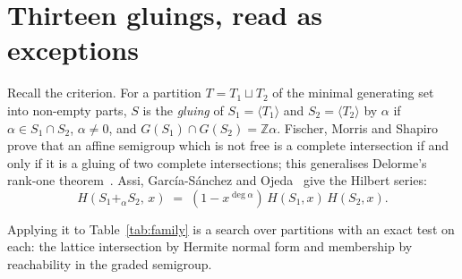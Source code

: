 \documentclass[11pt,a4paper]{article}
\theoremstyle{definition}
\newcommand{\ZZ}{\mathbb{Z}}
\begin{document}
\section{Thirteen gluings, read as exceptions}\label{sec:gluings}

Recall the criterion. For a partition $T=T_1\sqcup T_2$ of the minimal generating set into non-empty
parts, $S$ is the \emph{gluing} of $S_1=\langle T_1\rangle$ and $S_2=\langle T_2\rangle$ by $\alpha$
if $\alpha\in S_1\cap S_2$, $\alpha\neq0$, and $G(S_1)\cap G(S_2)=\ZZ\alpha$. Fischer, Morris and
Shapiro~\cite{FMS} prove that an affine semigroup which is not free is a complete intersection if
and only if it is a gluing of two complete intersections; this generalises Delorme's rank-one
theorem~\cite{Delorme}. Assi, Garc\'ia-S\'anchez and Ojeda~\cite{AGO} give the Hilbert series:
\begin{equation}\label{eq:ago}
\boxed{\;H(S_1+_\alpha S_2,\,x)\;=\;(1-x^{\deg\alpha})\,H(S_1,x)\,H(S_2,x).\;}
\end{equation}

Applying it to Table~\ref{tab:family} is a search over partitions with an exact test on each: the
lattice intersection by Hermite normal form and membership by reachability in the graded semigroup.
\end{document}
